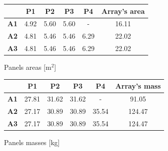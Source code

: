 \begin{minipage}{0.5\linewidth}
    \centering
    \captionsetup{type=table}
    \renewcommand{\arraystretch}{1.4}
    \begin{tabular}{|c|c|c|c|c|c|}
        \hline
        &  \textbf{P1}  & \textbf{P2} & \textbf{P3} & \textbf{P4} & \textbf{Array's area} \\
        \hline
        \hline
        \textbf{A1}      & 4.92 & 5.60 & 5.60 & - & 16.11  \\
        \hline
        \textbf{A2}      & 4.81 & 5.46 & 5.46 & 6.29 & 22.02 \\
        \hline
        \textbf{A3}     & 4.81 & 5.46 & 5.46 & 6.29 &  22.02 \\
        \hline
    \end{tabular}
    \caption{Panels areas [m$^2$]}
    \label{table:panels_area}

    \vspace*{3mm}

    \begin{tabular}{|c|c|c|c|c|c|}
        \hline
        &  \textbf{P1}  & \textbf{P2} & \textbf{P3} & \textbf{P4} & \textbf{Array's mass}\\
        \hline
        \hline
        \textbf{A1}      & 27.81 & 31.62 & 31.62& - & 91.05 \\
        \hline
        \textbf{A2}      & 27.17 & 30.89 & 30.89 & 35.54 & 124.47 \\
        \hline
        \textbf{A3}     & 27.17 & 30.89 & 30.89 & 35.54 & 124.47 \\
        \hline
    \end{tabular}
    \caption{Panels masses [kg]}
    \label{table:panels_mass}
\end{minipage}


